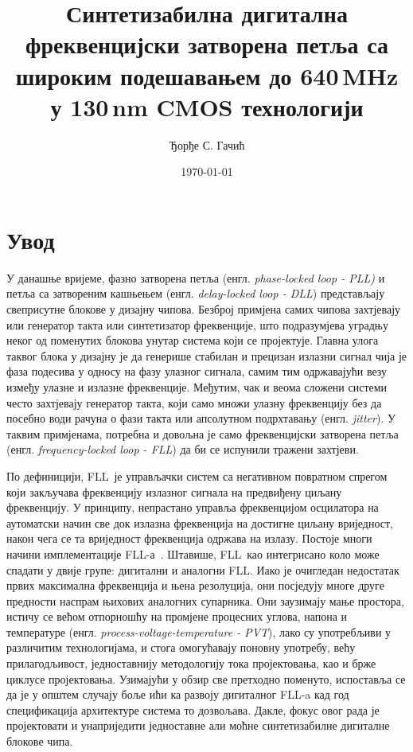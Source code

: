 \documentclass[master]{finthesis}
\title{Синтетизабилна дигитална фреквенцијски затворена петља са широким подешавањем до 640\texorpdfstring{\,}{ }MHz у 130\texorpdfstring{\,}{ }nm CMOS технологији}
\author{Ђорђе С. Гачић}
\date{\today}
\def \FLL {FLL} %
\begin{document}
\maketitle

\tableofcontents

\makeabstract

\section{Увод}
У данашње вријеме, фазно затворена петља (енгл. \textit{phase-locked loop - PLL)} и петља са затвореним кашњењем (енгл. \textit{delay-locked loop - DLL}) представљају свеприсутне блокове у дизајну чипова. Безброј примјена самих чипова захтјевају или генератор такта или синтетизатор фреквенције, што подразумјева уградњу неког од поменутих блокова унутар система који се пројектује. Главна улога таквог блока у дизајну је да генерише стабилан и прецизан излазни сигнал чија је фаза подесива у односу на фазу улазног сигнала, самим тим одржавајући везу између улазне и излазне фреквенције. Међутим, чак и веома сложени системи често захтјевају генератор такта, који само множи улазну фреквенцију без да посебно води рачуна о фази такта или апсолутном подрхтавању (енгл. \textit{jitter}). У таквим примјенама, потребна и довољна је само фреквенцијски затворена петља (енгл. \textit{frequency-locked loop - FLL}) да би се испунили тражени захтјеви.

По дефиницији, \FLL\ је управљачки систем са негативном повратном спрегом који закључава фреквенцију излазног сигнала на предвиђену циљану фреквенцију. У принципу, непрастано управља фреквенцијом осцилатора на аутоматски начин све док излазна фреквенција на достигне циљану вриједност, након чега се та вриједност фреквенција одржава на излазу. Постоје многи начини имплементације \FLL-а~\cite{Ali:9097205}. Штавише, \FLL\ као интегрисано коло може спадати у двије групе: дигитални и аналогни \FLL. Иако је очигледан недостатак првих максимална фреквенција и њена резолуција, они посједују многе друге предности наспрам њихових аналогних супарника. Они заузимају мање простора, истичу се већом отпорношћу на промјене процесних углова, напона и температуре (енгл. \textit{process-voltage-temperature - PVT}), лако су употребљиви у различитим технологијама, и стога омогућавају поновну употребу, већу прилагодљивост, једноставнију методологију тока пројектовања, као и брже циклусе пројектовања. Узимајући у обзир све претходно поменуто, испоставља се да је у општем случају боље ићи ка развоју дигиталног \FLL-a кад год спецификација архитектуре система то дозвољава. Дакле, фокус овог рада је пројектовати и унаприједити једноставне али моћне синтетизабилне дигиталне блокове чипа.
\end{document}
